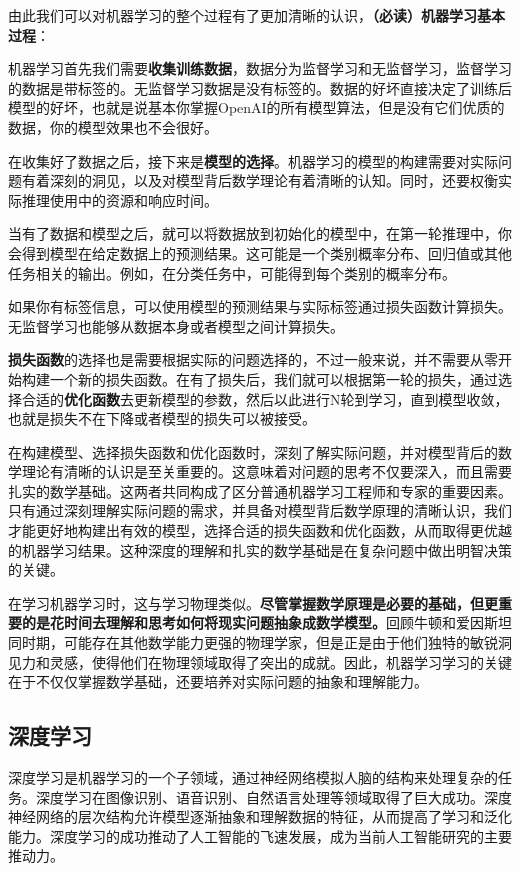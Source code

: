 由此我们可以对机器学习的整个过程有了更加清晰的认识，\textbf{（必读）机器学习基本过程}：

机器学习首先我们需要\textbf{收集训练数据}，数据分为监督学习和无监督学习，监督学习的数据是带标签的。无监督学习数据是没有标签的。数据的好坏直接决定了训练后模型的好坏，也就是说基本你掌握OpenAI的所有模型算法，但是没有它们优质的数据，你的模型效果也不会很好。

在收集好了数据之后，接下来是\textbf{模型的选择}。机器学习的模型的构建需要对实际问题有着深刻的洞见，以及对模型背后数学理论有着清晰的认知。同时，还要权衡实际推理使用中的资源和响应时间。

当有了数据和模型之后，就可以将数据放到初始化的模型中，在第一轮推理中，你会得到模型在给定数据上的预测结果。这可能是一个类别概率分布、回归值或其他任务相关的输出。例如，在分类任务中，可能得到每个类别的概率分布。

如果你有标签信息，可以使用模型的预测结果与实际标签通过损失函数计算损失。无监督学习也能够从数据本身或者模型之间计算损失。

\textbf{损失函数}的选择也是需要根据实际的问题选择的，不过一般来说，并不需要从零开始构建一个新的损失函数。在有了损失后，我们就可以根据第一轮的损失，通过选择合适的\textbf{优化函数}去更新模型的参数，然后以此进行N轮到学习，直到模型收敛，也就是损失不在下降或者模型的损失可以被接受。

在构建模型、选择损失函数和优化函数时，深刻了解实际问题，并对模型背后的数学理论有清晰的认识是至关重要的。这意味着对问题的思考不仅要深入，而且需要扎实的数学基础。这两者共同构成了区分普通机器学习工程师和专家的重要因素。只有通过深刻理解实际问题的需求，并具备对模型背后数学原理的清晰认识，我们才能更好地构建出有效的模型，选择合适的损失函数和优化函数，从而取得更优越的机器学习结果。这种深度的理解和扎实的数学基础是在复杂问题中做出明智决策的关键。

在学习机器学习时，这与学习物理类似。\textbf{尽管掌握数学原理是必要的基础，但更重要的是花时间去理解和思考如何将现实问题抽象成数学模型。}回顾牛顿和爱因斯坦同时期，可能存在其他数学能力更强的物理学家，但是正是由于他们独特的敏锐洞见力和灵感，使得他们在物理领域取得了突出的成就。因此，机器学习学习的关键在于不仅仅掌握数学基础，还要培养对实际问题的抽象和理解能力。

\subsection{深度学习}

深度学习是机器学习的一个子领域，通过神经网络模拟人脑的结构来处理复杂的任务。深度学习在图像识别、语音识别、自然语言处理等领域取得了巨大成功。深度神经网络的层次结构允许模型逐渐抽象和理解数据的特征，从而提高了学习和泛化能力。深度学习的成功推动了人工智能的飞速发展，成为当前人工智能研究的主要推动力。